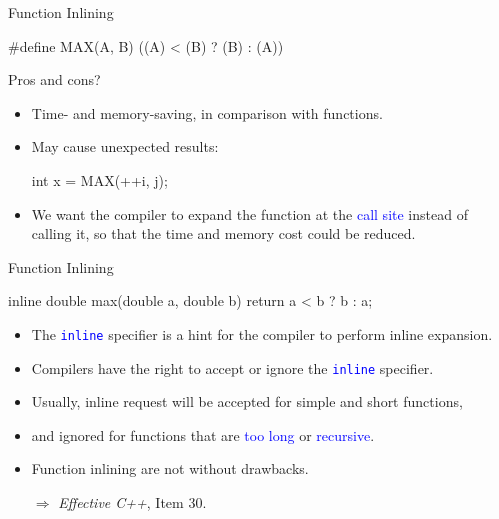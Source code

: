 \documentclass{beamer}
\newcommand{\blue}[1]{\textcolor{blue}{#1}}
\newcommand{\ttt}[1]{\texttt{#1}}
\newcommand{\bluett}[1]{\blue{\ttt{#1}}}
\begin{document}
\begin{frame}[fragile]{Function Inlining}
	\begin{cpp}
#define MAX(A, B) ((A) < (B) ? (B) : (A))
	\end{cpp}
	Pros and cons?
	\pause
	\begin{itemize}
		\item Time- and memory-saving, in comparison with functions.
		\item May cause unexpected results:
		\begin{cpp}
int x = MAX(++i, j);
		\end{cpp}
		\pause
		\item We want the compiler to expand the function at the \blue{call site} instead of calling it, so that the time and memory cost could be reduced.
	\end{itemize}
\end{frame}

\begin{frame}[fragile]{Function Inlining}
	\begin{cpp}
inline double max(double a, double b) {
  return a < b ? b : a;
}
	\end{cpp}
	\begin{itemize}
		\item The \bluett{inline} specifier is a hint for the compiler to perform inline expansion.
		\item Compilers have the right to accept or ignore the \bluett{inline} specifier.
		\pause
		\item Usually, inline request will be accepted for simple and short functions,
		\item and ignored for functions that are \blue{too long} or \blue{recursive}.
		\pause
		\item Function inlining are not without drawbacks.
		\item[\(\Rightarrow\)] \textit{Effective C++}, Item 30.
	\end{itemize}
\end{frame}
\end{document}
